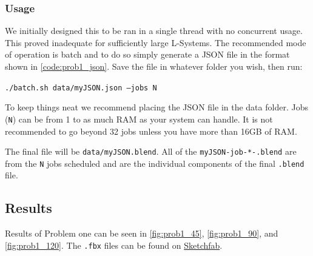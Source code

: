 \subsubsection{Usage}
We initially designed this to be ran in a single thread with no concurrent
usage. This proved inadequate for sufficiently large L-Systems. The recommended
mode of operation is batch and to do so simply generate a JSON file in
the format shown in \autoref{code:prob1_json}. Save the file
in whatever folder you wish, then run:

\texttt{./batch.sh data/myJSON.json --jobs N}

To keep things neat we recommend placing the JSON file in the data
folder. Jobs (\texttt{N}) can be from 1 to as much RAM as your system can
handle. It is not recommended to go beyond 32 jobs unless you have more than
16GB of RAM.

The final file will be \texttt{data/myJSON.blend}. All of the
\texttt{myJSON-job-*-.blend} are from the \texttt{N} jobs scheduled and are the
individual components of the final \texttt{.blend} file.



\subsection{Results}
Results of Problem one can be seen in \autoref{fig:prob1_45},
\autoref{fig:prob1_90}, and \autoref{fig:prob1_120}. The \texttt{.fbx} files can be
found on
\href{https://sketchfab.com/macattackftw/collections/problem-1}{Sketchfab}.


